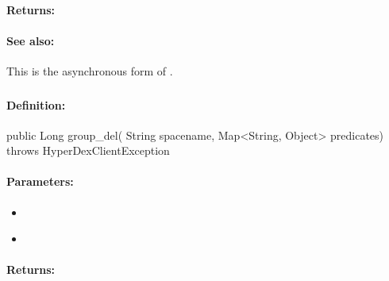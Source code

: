 \paragraph{Returns:}


\paragraph{See also:}  This is the asynchronous form of .

\pagebreak
\subsubsection{}
\label{api:java:group_del}


\paragraph{Definition:}
\begin{javacode}
public Long group_del(
        String spacename,
        Map<String, Object> predicates) throws HyperDexClientException
\end{javacode}

\paragraph{Parameters:}
\begin{itemize}[noitemsep]
\item {}\\

\item {}\\

\end{itemize}

\paragraph{Returns:}


\pagebreak
\subsubsection{}
\label{api:java:async_group_del}


